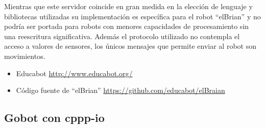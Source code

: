 Mientras que este servidor coincide en gran medida en la elección de lenguaje
y bibliotecas utilizadas su implementación es específica para el robot ``elBrian''
y no podría ser portada para robots con menores capacidades de procesamiento
sin una reescritura significativa. Además el protocolo utilizado no contempla
el acceso a valores de sensores, los únicos mensajes que permite enviar
al robot son movimientos.

\begin{itemize}
    \item Educabot \url{http://www.educabot.org/}
    \item Código fuente de ``elBrian'' \url{https://github.com/educabot/elBraian}
\end{itemize}

\subsection{Gobot con cppp-io}

